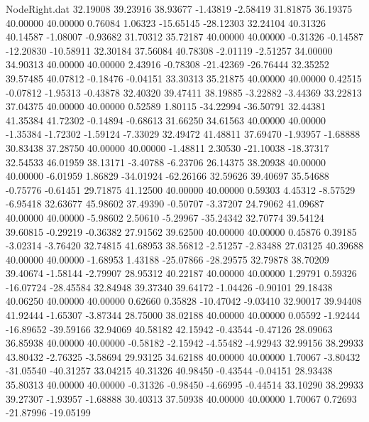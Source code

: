 \begin{filecontents}{NodeRight.dat}
  32.19008   39.23916   38.93677    -1.43819   -2.58419   31.81875   36.19375   40.00000   40.00000    0.76084    1.06323  -15.65145  -28.12303
  32.24104   40.31326   40.14587    -1.08007   -0.93682   31.70312   35.72187   40.00000   40.00000   -0.31326   -0.14587  -12.20830  -10.58911
  32.30184   37.56084   40.78308    -2.01119   -2.51257   34.00000   34.90313   40.00000   40.00000    2.43916   -0.78308  -21.42369  -26.76444
  32.35252   39.57485   40.07812    -0.18476   -0.04151   33.30313   35.21875   40.00000   40.00000    0.42515   -0.07812   -1.95313   -0.43878
  32.40320   39.47411   38.19885    -3.22882   -3.44369   33.22813   37.04375   40.00000   40.00000    0.52589    1.80115  -34.22994  -36.50791
  32.44381   41.35384   41.72302    -0.14894   -0.68613   31.66250   34.61563   40.00000   40.00000   -1.35384   -1.72302   -1.59124   -7.33029
  32.49472   41.48811   37.69470    -1.93957   -1.68888   30.83438   37.28750   40.00000   40.00000   -1.48811    2.30530  -21.10038  -18.37317
  32.54533   46.01959   38.13171    -3.40788   -6.23706   26.14375   38.20938   40.00000   40.00000   -6.01959    1.86829  -34.01924  -62.26166
  32.59626   39.40697   35.54688    -0.75776   -0.61451   29.71875   41.12500   40.00000   40.00000    0.59303    4.45312   -8.57529   -6.95418
  32.63677   45.98602   37.49390    -0.50707   -3.37207   24.79062   41.09687   40.00000   40.00000   -5.98602    2.50610   -5.29967  -35.24342
  32.70774   39.54124   39.60815    -0.29219   -0.36382   27.91562   39.62500   40.00000   40.00000    0.45876    0.39185   -3.02314   -3.76420
  32.74815   41.68953   38.56812    -2.51257   -2.83488   27.03125   40.39688   40.00000   40.00000   -1.68953    1.43188  -25.07866  -28.29575
  32.79878   38.70209   39.40674    -1.58144   -2.79907   28.95312   40.22187   40.00000   40.00000    1.29791    0.59326  -16.07724  -28.45584
  32.84948   39.37340   39.64172    -1.04426   -0.90101   29.18438   40.06250   40.00000   40.00000    0.62660    0.35828  -10.47042   -9.03410
  32.90017   39.94408   41.92444    -1.65307   -3.87344   28.75000   38.02188   40.00000   40.00000    0.05592   -1.92444  -16.89652  -39.59166
  32.94069   40.58182   42.15942    -0.43544   -0.47126   28.09063   36.85938   40.00000   40.00000   -0.58182   -2.15942   -4.55482   -4.92943
  32.99156   38.29933   43.80432    -2.76325   -3.58694   29.93125   34.62188   40.00000   40.00000    1.70067   -3.80432  -31.05540  -40.31257
  33.04215   40.31326   40.98450    -0.43544   -0.04151   28.93438   35.80313   40.00000   40.00000   -0.31326   -0.98450   -4.66995   -0.44514
  33.10290   38.29933   39.27307    -1.93957   -1.68888   30.40313   37.50938   40.00000   40.00000    1.70067    0.72693  -21.87996  -19.05199

\end{filecontents}
